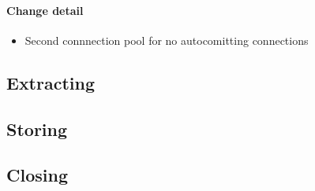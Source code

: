 \paragraph{Change detail}
\begin{itemize}
  \item Second connnection pool for no autocomitting connections
\end{itemize}

\subsection{Extracting}


\subsection{Storing}

\subsection{Closing}







